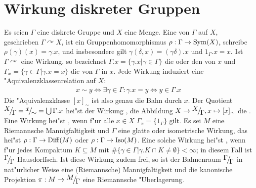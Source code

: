 \section{Wirkung diskreter Gruppen}
Es seien $\Gamma$ eine diskrete Gruppe und $X$ eine Menge.
Eine  von $\Gamma$ auf $X$, geschrieben $\Gamma \curvearrowright X$, ist ein Gruppenhomomorphismus $\rho: \Gamma \to \Sym(X)$, schreibe $\rho(\gamma)(x) = \gamma.x$, und insbesondere gilt $\gamma(\delta, x) = (\gamma \delta).x$ und $1_\Gamma.x = x$.
Ist $\Gamma \curvearrowright$ eine Wirkung, so bezeichnet $\Gamma.x = \{\gamma.x | \gamma \in \Gamma\}$ die  oder den  von $x$ und $\Gamma_x = \{\gamma \in \Gamma | \gamma.x = x \}$ die  von $\Gamma$ in $x$.
Jede Wirkung induziert eine "Aquivalenzklassenrelation auf $X$:
\begin{align*}
	x \sim y \Leftrightarrow \exists \gamma \in \Gamma: \gamma.x = y \Leftrightarrow y \in \Gamma.x
\end{align*}
Die "Aquivalenzklasse $[x]_\sim$ ist also genau die Bahn durch $x$.
Der Quotient $\FakRaum{X}{\Gamma} = \FakRaum{x}{\sim} = \bigcup \Gamma.x$ hei"st  der Wirkung , die Abbildung $X \to \FakRaum{X}{\Gamma}, x \mapsto [x]_\sim$ die .
Eine Wirkung hei"st , wenn f"ur alle $x \in X$ $\Gamma_x = \{ 1_\Gamma \}$ gilt.
Es sei $M$ eine Riemannsche Mannigfaltigkeit und $\Gamma$ eine glatte oder isometrische Wirkung, das hei"st $\rho: \Gamma \to \Diff(M)$ oder $\rho: \Gamma \to \Iso(M)$.
Eine solche Wirkung hei"st , wenn f"ur jedes Kompaktum $K \subseteq M$ mit $\# \{ \gamma \in \Gamma | \gamma.K \cap K \ne \emptyset \} < \infty$; in diesem Fall ist $\FakRaum{\Gamma}{\Gamma}$ Hausdorffsch.
Ist diese Wirkung zudem frei, so ist der Bahnenraum $\FakRaum{\Gamma}{\Gamma}$ in nat"urlicher Weise eine (Riemannsche) Mannigfaltigkeit und die kanonische Projektion $\pi: M \to \FakRaum{M}{\Gamma}$ eine Riemannsche "Uberlagerung.

